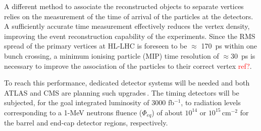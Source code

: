 \documentclass{article}
\begin{document}
A different method to associate the reconstructed objects to separate vertices relies on the measurement of the time of arrival of the particles at the detectors.
A sufficiently accurate time measurement effectively reduces the vertex density, improving the event reconstruction capability of the experiments.
Since the RMS spread of the primary vertices at HL-LHC is foreseen to be $\approx$ 170~ps within one bunch crossing, a minimum ionising particle (MIP) time resolution of $\approx 30$~ps is necessary to improve the association of the particles to their correct vertex \textcolor{red}{ref?}.

To reach this performance, dedicated detector systems will be needed and both ATLAS and CMS are planning such upgrades\,\cite{cmsMIPtiming,atlasMIPtiming}.
The timing detectors will be subjected, for the goal integrated luminosity of 3000 fb$^{-1}$, to radiation levels corresponding to a 1-MeV neutrons fluence ($\Phi_{eq}$) of about $10^{14}$ or $10^{15}$\,cm$^{-2}$ for the barrel and end-cap detector regions, respectively.



\end{document}
